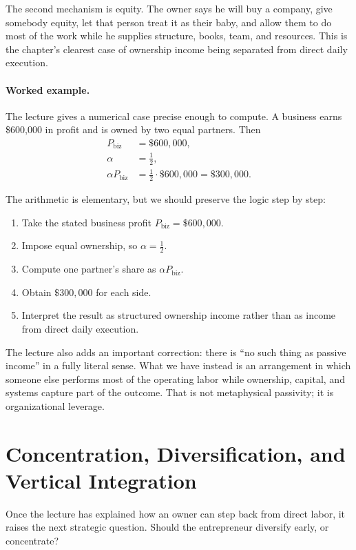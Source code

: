 The second mechanism is equity. The owner says he will buy a company, give somebody equity, let that person treat it as their baby, and allow them to do most of the work while he supplies structure, books, team, and resources. This is the chapter's clearest case of ownership income being separated from direct daily execution.

\paragraph{Worked example.} The lecture gives a numerical case precise enough to compute. A business earns \$600{,}000 in profit and is owned by two equal partners. Then
\begin{align}
P_{\mathrm{biz}} &= \$600{,}000,\\
\alpha &= \tfrac12,\\
\alpha P_{\mathrm{biz}} &= \tfrac12 \cdot \$600{,}000 = \$300{,}000.
\end{align}

The arithmetic is elementary, but we should preserve the logic step by step:

\begin{enumerate}
\item Take the stated business profit \(P_{\mathrm{biz}}=\$600{,}000\).
\item Impose equal ownership, so \(\alpha=\tfrac12\).
\item Compute one partner's share as \(\alpha P_{\mathrm{biz}}\).
\item Obtain \(\$300{,}000\) for each side.
\item Interpret the result as structured ownership income rather than as income from direct daily execution.
\end{enumerate}

The lecture also adds an important correction: there is ``no such thing as passive income'' in a fully literal sense. What we have instead is an arrangement in which someone else performs most of the operating labor while ownership, capital, and systems capture part of the outcome. That is not metaphysical passivity; it is organizational leverage.

\section{Concentration, Diversification, and Vertical Integration}

Once the lecture has explained how an owner can step back from direct labor, it raises the next strategic question. Should the entrepreneur diversify early, or concentrate?

